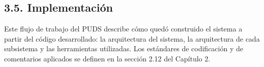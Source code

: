 \subsection{3.5. Implementación}\label{sec:v2_implementacion}

Este flujo de trabajo del PUDS describe cómo quedó construido el sistema a partir del código desarrollado: la arquitectura del sistema, la arquitectura de cada subsistema y las herramientas utilizadas. Los estándares de codificación y de comentarios aplicados se definen en la sección 2.12 del Capítulo 2.




